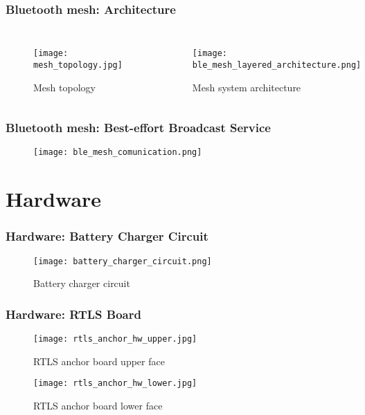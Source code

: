 \documentclass[10pt]{beamer}
\begin{document}
\begin{frame}
    \frametitle{Bluetooth mesh: Architecture}
    \begin{columns}
        \begin{figure}[H]
            \centering
            \texttt{[image: mesh\_topology.jpg]}
            \caption{Mesh topology}
        \end{figure}
        \begin{figure}[H]
            \texttt{[image: ble\_mesh\_layered\_architecture.png]}
            \caption{Mesh system architecture}
        \end{figure}
    \end{columns}
\end{frame}

\begin{frame}
    \frametitle{Bluetooth mesh:  Best-effort Broadcast Service}
    \begin{figure}[H]
        \centering
        \texttt{[image: ble\_mesh\_comunication.png]}
    \end{figure}
\end{frame}

\section{Hardware}
\begin{frame}
    \frametitle{Hardware: Battery Charger Circuit}
    \begin{figure}[H]
        \centering
        \texttt{[image: battery\_charger\_circuit.png]}
        \caption{Battery charger circuit}
    \end{figure}
\end{frame}

\begin{frame}
    \frametitle{Hardware: RTLS Board}
    \begin{figure}[H]
        \centering
        \texttt{[image: rtls\_anchor\_hw\_upper.jpg]}
        \caption{RTLS anchor board upper face}
    \end{figure}
    \begin{figure}[H]
        \centering
        \texttt{[image: rtls\_anchor\_hw\_lower.jpg]}
        \caption{RTLS anchor board lower face}
    \end{figure}
\end{frame}
\end{document}
